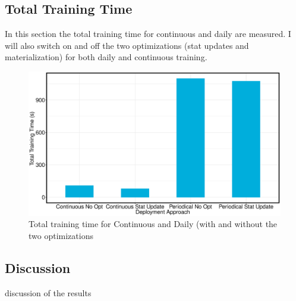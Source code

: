 \subsection{Total Training Time}
In this section the total training time for continuous and daily are measured.
I will also switch on and off the two optimizations (stat updates and materialization) for both daily and continuous training.
\begin{figure}[h!]
\centering
\includegraphics[width=\columnwidth]{../images/experiment-results/training-time-experiment.eps}
\caption{Total training time for Continuous and Daily (with and without the two optimizations}
\label{fig:deployment-training-time}
\vspace{2mm}
\end{figure}


\subsection{Discussion} \label{subsec:discussion}
discussion of the results
